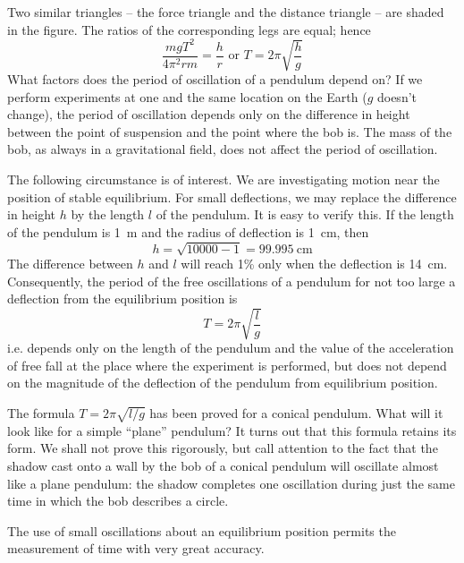 Two similar triangles -- the force triangle and the
distance triangle -- are shaded in the figure. The ratios of
the corresponding legs are equal; hence
\begin{equation*}%
\frac{mgT^{2}}{4 \pi^{2}rm} = \frac{h}{r}\,\, \textrm{or} \,\,
T = 2 \pi \sqrt{\frac{h}{g}}
\end{equation*}
What factors does the period of oscillation of a pendulum depend on? If we perform experiments at one and the same location on the Earth ($g$ doesn't change), the period of oscillation depends only on the difference in height between the point of suspension and the point
where the bob is. The mass of the bob, as always in a gravitational field, does not affect the period of oscillation.

The following circumstance is of interest. We are
investigating motion near the position of stable equilibrium. For small deflections, we may replace the difference in height $h$ by the length $l$ of the pendulum. It is easy to verify this. If the length of the pendulum is \SI{1}{\meter} and the radius of deflection is \SI{1}{\centi\meter}, then 
\begin{equation*}%
h = \sqrt{\num{10 000} - 1} = \SI{99.995}{\centi\meter}
\end{equation*}
The difference between $h$ and $l$ will reach 1\% only when
the deflection is \SI{14}{\centi\meter}. Consequently, the period of the
free oscillations of a pendulum for not too large a deflection from the equilibrium position is
\begin{equation*}%
T = 2 \pi \sqrt{\frac{l}{g}}
\end{equation*}
i.e. depends only on the length of the pendulum and the
value of the acceleration of free fall at the place where the
experiment is performed, but does not depend on the
magnitude of the deflection of the pendulum from equilibrium position.

The formula $T = 2\pi \sqrt{l/g}$ has been proved for a conical
pendulum. What will it look like for a simple ``plane''
pendulum? It turns out that this formula retains its
form. We shall not prove this rigorously, but call attention to the fact that the shadow cast onto a wall by the bob of a conical pendulum will oscillate almost like a plane pendulum: the shadow completes one oscillation during just the same time in which the bob describes
a circle.

The use of small oscillations about an equilibrium
position permits the measurement of time with very
great accuracy.

